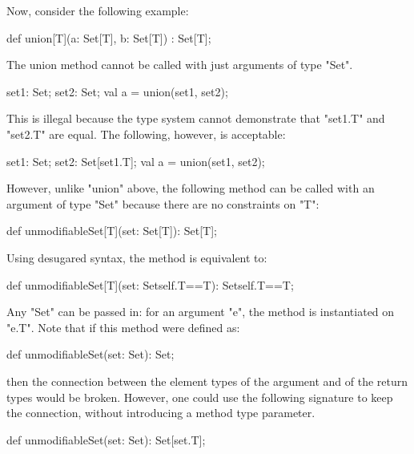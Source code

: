 Now, consider the following example:
\begin{xten}
def union[T](a: Set[T], b: Set[T]) : Set[T];
\end{xten}
The union method cannot be called with just arguments of type \xcd"Set".
\begin{xten}
set1: Set;
set2: Set;
val a = union(set1, set2);
\end{xten}
This is illegal because the type system cannot demonstrate that
\xcd"set1.T" and \xcd"set2.T" are equal.
The following, however, is acceptable:
\begin{xten}
set1: Set;
set2: Set[set1.T];
val a = union(set1, set2);
\end{xten}

However, unlike \xcd"union" above,
the following method can be called with an argument of type \xcd"Set"
because there are no constraints on \xcd"T":
\begin{xten}
def unmodifiableSet[T](set: Set[T]): Set[T];
\end{xten}

Using desugared syntax, the method is
equivalent to: 
\begin{xten}
def unmodifiableSet[T](set: Set{self.T==T}): Set{self.T==T};
\end{xten}
Any \xcd"Set" can be passed in: for an argument \xcd"e", the method
is instantiated on \xcd"e.T".
%
Note that if this method were defined as:
\begin{xten}
def unmodifiableSet(set: Set): Set;
\end{xten}
then the connection between the element types of the
argument and of the return types would be broken.
However, one could use the following signature to keep the
connection, without introducing a method type parameter. 
\begin{xten}
def unmodifiableSet(set: Set): Set[set.T];
\end{xten}
